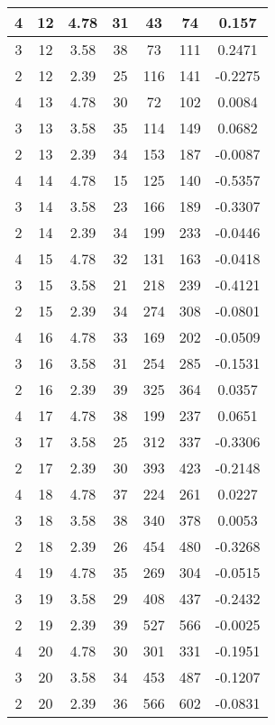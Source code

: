 \documentclass[letterpaper, 12pt]{article}
\begin{document}
\begin{longtable}{|c|c|c|c|c|c|c|}
\hline
4 & 12 & 4.78 & 31 & 43 & 74 & 0.157 \\
\hline
3 & 12 & 3.58 & 38 & 73 & 111 & 0.2471 \\
\hline
2 & 12 & 2.39 & 25 & 116 & 141 & -0.2275 \\
\hline
4 & 13 & 4.78 & 30 & 72 & 102 & 0.0084 \\
\hline
3 & 13 & 3.58 & 35 & 114 & 149 & 0.0682 \\
\hline
2 & 13 & 2.39 & 34 & 153 & 187 & -0.0087 \\
\hline
4 & 14 & 4.78 & 15 & 125 & 140 & -0.5357 \\
\hline
3 & 14 & 3.58 & 23 & 166 & 189 & -0.3307 \\
\hline
2 & 14 & 2.39 & 34 & 199 & 233 & -0.0446 \\
\hline
4 & 15 & 4.78 & 32 & 131 & 163 & -0.0418 \\
\hline
3 & 15 & 3.58 & 21 & 218 & 239 & -0.4121 \\
\hline
2 & 15 & 2.39 & 34 & 274 & 308 & -0.0801 \\
\hline
4 & 16 & 4.78 & 33 & 169 & 202 & -0.0509 \\
\hline
3 & 16 & 3.58 & 31 & 254 & 285 & -0.1531 \\
\hline
2 & 16 & 2.39 & 39 & 325 & 364 & 0.0357 \\
\hline
4 & 17 & 4.78 & 38 & 199 & 237 & 0.0651 \\
\hline
3 & 17 & 3.58 & 25 & 312 & 337 & -0.3306 \\
\hline
2 & 17 & 2.39 & 30 & 393 & 423 & -0.2148 \\
\hline
4 & 18 & 4.78 & 37 & 224 & 261 & 0.0227 \\
\hline
3 & 18 & 3.58 & 38 & 340 & 378 & 0.0053 \\
\hline
2 & 18 & 2.39 & 26 & 454 & 480 & -0.3268 \\
\hline
4 & 19 & 4.78 & 35 & 269 & 304 & -0.0515 \\
\hline
3 & 19 & 3.58 & 29 & 408 & 437 & -0.2432 \\
\hline
2 & 19 & 2.39 & 39 & 527 & 566 & -0.0025 \\
\hline
4 & 20 & 4.78 & 30 & 301 & 331 & -0.1951 \\
\hline
3 & 20 & 3.58 & 34 & 453 & 487 & -0.1207 \\
\hline
2 & 20 & 2.39 & 36 & 566 & 602 & -0.0831 \\
\hline
\end{longtable}
\end{document}
